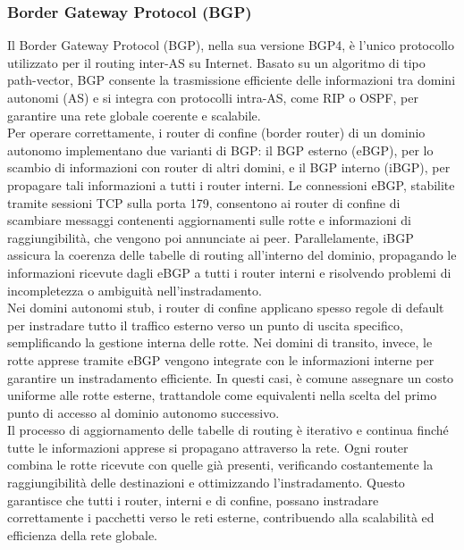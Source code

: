 \documentclass[12pt]{report}
\begin{document}
\subsubsection{Border Gateway Protocol (BGP)}
Il Border Gateway Protocol (BGP), nella sua versione BGP4, è l’unico protocollo utilizzato per il routing inter-AS su Internet. Basato su un algoritmo di tipo path-vector, BGP consente la trasmissione efficiente delle informazioni tra domini autonomi (AS) e si integra con protocolli intra-AS, come RIP o OSPF, per garantire una rete globale coerente e scalabile.
\vspace{\baselineskip}\\
Per operare correttamente, i router di confine (border router) di un dominio autonomo implementano due varianti di BGP: il BGP esterno (eBGP), per lo scambio di informazioni con router di altri domini, e il BGP interno (iBGP), per propagare tali informazioni a tutti i router interni. Le connessioni eBGP, stabilite tramite sessioni TCP sulla porta 179, consentono ai router di confine di scambiare messaggi contenenti aggiornamenti sulle rotte e informazioni di raggiungibilità, che vengono poi annunciate ai peer. Parallelamente, iBGP assicura la coerenza delle tabelle di routing all’interno del dominio, propagando le informazioni ricevute dagli eBGP a tutti i router interni e risolvendo problemi di incompletezza o ambiguità nell’instradamento.
\vspace{\baselineskip}\\
Nei domini autonomi stub, i router di confine applicano spesso regole di default per instradare tutto il traffico esterno verso un punto di uscita specifico, semplificando la gestione interna delle rotte. Nei domini di transito, invece, le rotte apprese tramite eBGP vengono integrate con le informazioni interne per garantire un instradamento efficiente. In questi casi, è comune assegnare un costo uniforme alle rotte esterne, trattandole come equivalenti nella scelta del primo punto di accesso al dominio autonomo successivo.
\vspace{\baselineskip}\\
Il processo di aggiornamento delle tabelle di routing è iterativo e continua finché tutte le informazioni apprese si propagano attraverso la rete. Ogni router combina le rotte ricevute con quelle già presenti, verificando costantemente la raggiungibilità delle destinazioni e ottimizzando l’instradamento. Questo garantisce che tutti i router, interni e di confine, possano instradare correttamente i pacchetti verso le reti esterne, contribuendo alla scalabilità ed efficienza della rete globale.
\end{document}
